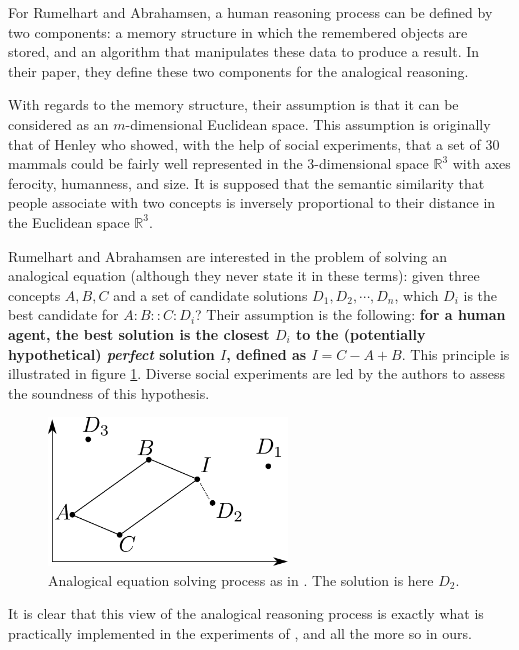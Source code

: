 For Rumelhart and Abrahamsen, a human reasoning process can be defined by two
components: a memory structure in which the remembered objects are stored, and
an algorithm that manipulates these data to produce a result. In their paper,
they define these two components for the analogical reasoning.

With regards to the memory structure, their assumption is that it can be
considered as an $m$-dimensional Euclidean space. This assumption is originally
that of Henley \cite{Hen69} who showed, with the help of social experiments,
that a set of 30 mammals could be fairly well represented in the 3-dimensional
space $\mathbb{R}^3$ with axes ferocity, humanness, and size. It is supposed
that the semantic similarity that people associate with two concepts is
inversely proportional to their distance in the Euclidean space $\mathbb{R}^3$.

Rumelhart and Abrahamsen are interested in the problem of solving an analogical
equation (although they never state it in these terms): given three concepts
$A, B, C$ and a set of candidate solutions $D_1, D_2, \cdots, D_n$, which $D_i$
is the best candidate for $A:B::C:D_i$? Their assumption is the following:
\textbf{ for a human agent, the best solution is the closest $D_i$ to the
(potentially hypothetical) \textit{perfect} solution $I$, defined as $I = C - A
+ B$}. This principle is illustrated in figure \ref{FIG:rumelhart_model}.
Diverse social experiments are led by the authors to assess the soundness of
this hypothesis.

\begin{figure}[!h]
\centering
\includegraphics[width=2.5in]{figures/rumelhart_model.pdf}
  \caption{Analogical equation solving process as in \cite{RumAbr73}. The
  solution is here $D_2$.}
\label{FIG:rumelhart_model}
\end{figure}

It is clear that this view of the analogical reasoning process is exactly what
is practically implemented in the experiments of \cite{BayMicDelIJCAI07}, and
all the more so in ours.

